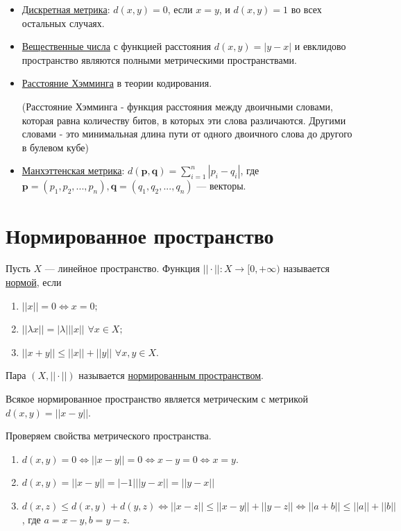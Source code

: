     \begin{example}
    	\begin{itemize}
    		\item \underline{Дискретная метрика}: $d(x, y) = 0$, если $x = y$, и $d(x, y) = 1$ во всех остальных случаях.
    		\item \underline{Вещественные числа} с функцией расстояния $d(x, y) = |y - x|$ и евклидово пространство являются полными метрическими пространствами.
    		\item \underline{Расстояние Хэмминга} в теории кодирования.
    		
    		(Расстояние Хэмминга - функция расстояния между двоичными словами, которая равна количеству битов, в которых эти слова различаются. Другими словами - это минимальная длина пути от одного двоичного слова до другого в булевом кубе)
    		\item \underline{Манхэттенская метрика}: $d(\textbf{p}, \textbf{q}) = \sum^n_{i = 1} |p_i - q_i|$,
    		где $\textbf{p} = (p_1, p_2, ..., p_n), \textbf{q} = (q_1, q_2, ..., q_n)$ — векторы.
    	\end{itemize}
    \end{example}
    
    \section{Нормированное пространство}
    
    \begin{definition}
    	Пусть $X$ — линейное пространство. Функция
    	$||\cdot||: X \rightarrow [0, +\infty)$ называется \underline{нормой}, если
    	\begin{enumerate}
    		\item $||x|| = 0 \Leftrightarrow x = 0;$
    		\item $||\lambda x|| = |\lambda| ||x||$ $\forall x \in X;$
    		\item $||x + y|| \leqslant ||x|| + ||y||$ $\forall x, y \in X.$
    	\end{enumerate}
    	Пара $(X, ||\cdot||)$ называется \underline{нормированным пространством}.
    \end{definition}
    Всякое нормированное пространство является метрическим с метрикой $d(x, y) = ||x - y||$.
    
    Проверяем свойства метрического пространства.
    \begin{enumerate}
    	\item $d(x, y) = 0 \Leftrightarrow ||x - y|| = 0 \Leftrightarrow x - y = 0 \Leftrightarrow x = y.$
    	\item $d(x, y) = ||x - y|| = |-1|||y - x|| = ||y - x||$
    	\item $d(x, z) \leqslant d(x, y) + d(y, z) \Leftrightarrow ||x - z|| \leqslant ||x - y|| + ||y - z|| \Leftrightarrow  ||a + b|| \leqslant ||a|| + ||b||$, где $a = x - y, b = y - z$.
    \end{enumerate}
    

